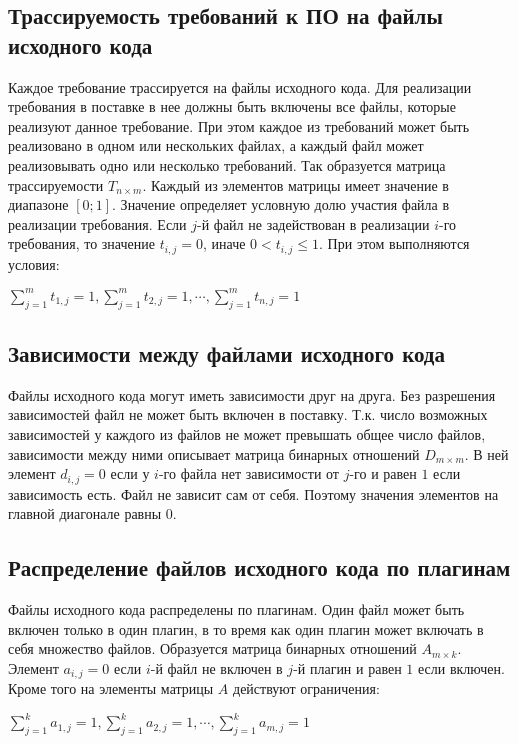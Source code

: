 \subsection*{Трассируемость требований к ПО на файлы исходного кода}
Каждое требование трассируется на файлы исходного кода. Для реализации требования в поставке в нее должны быть включены все файлы, которые реализуют данное требование. При этом каждое из требований может быть реализовано в одном или нескольких файлах, а каждый файл может реализовывать одно или несколько требований. Так образуется матрица трассируемости $T_{n \times m}$. Каждый из элементов матрицы имеет значение в диапазоне $[0;1]$. Значение определяет условную долю участия файла в реализации требования. Если $j$-й файл не задействован в реализации $i$-го требования, то значение $t_{i, j} = 0$, иначе $0 < t_{i, j} \le 1$. При этом выполняются условия:
\begin{center}
  $\displaystyle \sum^{m}_{j = 1}t_{1, j} = 1, 
    \sum^{m}_{j = 1}t_{2, j} = 1, \cdots, \sum^{m}_{j = 1}t_{n, j} = 1$
\end{center}

\subsection*{Зависимости между файлами исходного кода}
Файлы исходного кода могут иметь зависимости друг на друга. Без разрешения зависимостей файл не может быть включен в поставку. Т.к. число возможных зависимостей у каждого из файлов не может превышать общее число файлов, зависимости между ними описывает матрица бинарных отношений $D_{m \times m}$. В ней элемент $d_{i, j} = 0$ если у $i$-го файла нет зависимости от $j$-го и равен $1$ если зависимость есть. Файл не зависит сам от себя. Поэтому значения элементов на главной диагонале равны $0$.

\subsection*{Распределение файлов исходного кода по плагинам}
Файлы исходного кода распределены по плагинам. Один файл может быть включен только в один плагин, в то время как один плагин может включать в себя множество файлов. Образуется матрица бинарных отношений $A_{m \times k}$. Элемент $a_{i, j} = 0$ если $i$-й файл не включен в $j$-й плагин и равен $1$ если включен. Кроме того на элементы матрицы $A$ действуют ограничения:
\begin{center}
  $\displaystyle \sum^{k}_{j = 1}a_{1, j} = 1, \sum^{k}_{j = 1}a_{2, j} = 1, \cdots, \sum^{k}_{j = 1}a_{m, j} = 1$
\end{center}

